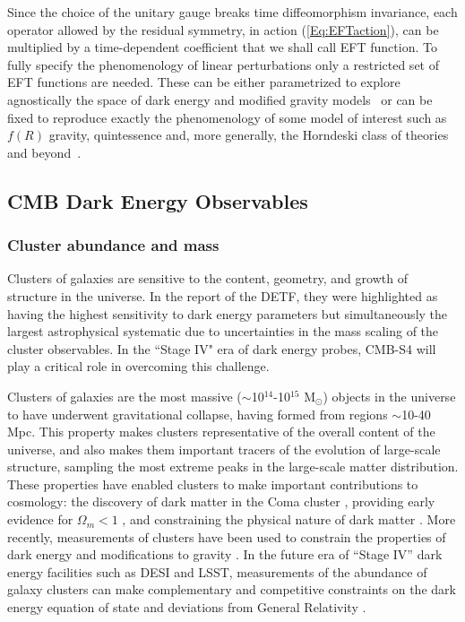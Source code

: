 Since the choice of the unitary gauge breaks time diffeomorphism invariance, each operator allowed by the residual symmetry, in action (\ref{Eq:EFTaction}), can be multiplied by a time-dependent coefficient that we shall call EFT function. To fully specify the phenomenology of linear perturbations only a restricted set of EFT functions are needed. These can be either parametrized to explore agnostically the space of dark energy and modified gravity models~\cite{Gleyzes:2013ooa,Bloomfield:2013efa,Piazza:2013coa,Gleyzes:2014rba} or can be fixed to reproduce exactly the phenomenology of some model of interest such as $f(R)$ gravity, quintessence and, more generally, the Horndeski class of theories and beyond~\cite{Gleyzes:2014dya,Frusciante:2015maa,Frusciante:2016xoj}.
%
\subsection{CMB  Dark Energy Observables}

\subsubsection{Cluster abundance and mass}

Clusters of galaxies are sensitive to the content, geometry, and growth of structure in the universe.     In the report of the DETF, they were highlighted as having the highest sensitivity
to dark energy parameters  but simultaneously the largest astrophysical systematic due
to uncertainties in the mass scaling of the cluster observables.   In the ``Stage IV" era of
dark energy probes, CMB-S4 will play a critical role in overcoming this challenge.




Clusters of galaxies are the most massive ($\sim$10$^{14}$-10$^{15}$ M$_{\odot}$) objects in the universe to have underwent gravitational collapse, 
having formed from regions $\sim$10-40 Mpc.  This property makes clusters representative of the overall content of the universe, and also makes them 
important tracers of the evolution of large-scale structure, sampling the most extreme peaks in the large-scale matter distribution.  
These properties have enabled clusters to make important contributions to cosmology: the discovery of dark matter in the 
Coma cluster \cite{Zwicky:1933gu}, 
providing early evidence for $\Omega_m < 1$ \cite{White:1993wm, Donahue:1997sp, Bahcall:1998ur}, and
constraining the physical nature of dark matter \cite{Clowe:2006eq}.  
More recently, measurements of clusters have been used to constrain the properties of dark energy and modifications 
to gravity \cite{Vikhlinin:2008ym, Mantz:2009fw, Rapetti:2012bu, Benson:2011uta, Mantz:2014xba, Mantz:2014paa}.   In the future era of ``Stage IV'' dark energy 
facilities such as DESI and LSST, measurements of the abundance of galaxy clusters can make complementary and 
competitive constraints on the dark energy equation of state and deviations from General Relativity \cite{Weinberg:2012es}.  

